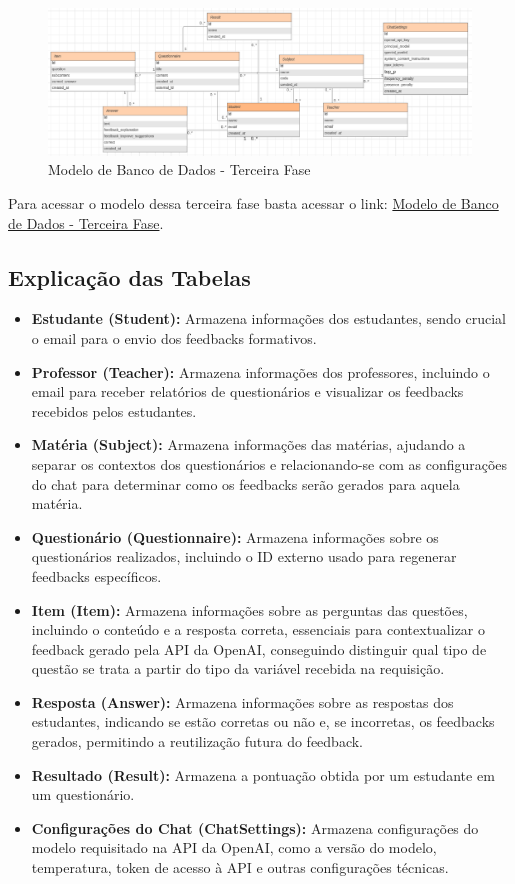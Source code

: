 \begin{figure}[H]
    \centering
    \includegraphics[width=1\textwidth]{figuras/bd-phase3.png}
    \caption{Modelo de Banco de Dados - Terceira Fase}
    \label{fig:third_phase}
\end{figure}

Para acessar o modelo dessa terceira fase basta acessar o link: \href{https://lucid.app/lucidchart/c1e592ab-3b4a-4bba-9849-cc3237f4fa76/edit?viewport_loc=-2447%2C-1073%2C2164%2C956%2C0_0&invitationId=inv_fbaaf515-3973-4d6a-9359-eb0dc4a26eee}{Modelo de Banco de Dados - Terceira Fase}.

\subsection{Explicação das Tabelas}

\begin{itemize}
    \item \textbf{Estudante (Student):} Armazena informações dos estudantes, sendo crucial o email para o envio dos feedbacks formativos.
    \item \textbf{Professor (Teacher):} Armazena informações dos professores, incluindo o email para receber relatórios de questionários e visualizar os feedbacks recebidos pelos estudantes.
    \item \textbf{Matéria (Subject):} Armazena informações das matérias, ajudando a separar os contextos dos questionários e relacionando-se com as configurações do chat para determinar como os feedbacks serão gerados para aquela matéria.
    \item \textbf{Questionário (Questionnaire):} Armazena informações sobre os questionários realizados, incluindo o ID externo usado para regenerar feedbacks específicos.
    \item \textbf{Item (Item):} Armazena informações sobre as perguntas das questões, incluindo o conteúdo e a resposta correta, essenciais para contextualizar o feedback gerado pela API da OpenAI, conseguindo distinguir qual tipo de questão se trata a partir do tipo da variável recebida na requisição.
    \item \textbf{Resposta (Answer):} Armazena informações sobre as respostas dos estudantes, indicando se estão corretas ou não e, se incorretas, os feedbacks gerados, permitindo a reutilização futura do feedback.
    \item \textbf{Resultado (Result):} Armazena a pontuação obtida por um estudante em um questionário.
    \item \textbf{Configurações do Chat (ChatSettings):} Armazena configurações do modelo requisitado na API da OpenAI, como a versão do modelo, temperatura, token de acesso à API e outras configurações técnicas.
\end{itemize}


